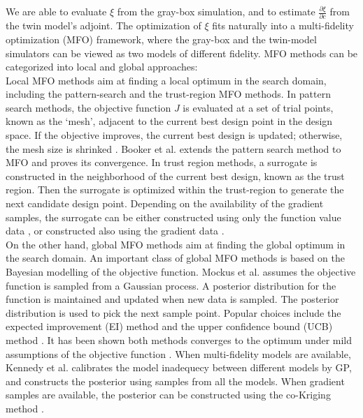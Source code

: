 \documentclass[a4paper,onecolumn]{article}
\theoremstyle{remark}
\begin{document}
\indent We are able to evaluate $\xi$ from the gray-box simulation, and to estimate
$\frac{\partial \xi}{\partial c}$ from the twin model's adjoint. The optimization
of $\xi$ fits naturally into a multi-fidelity optimization (MFO) framework,
where the gray-box and the twin-model simulators can be viewed as two models of different fidelity.
MFO methods can be categorized into local and global approaches:\\

Local MFO methods aim at finding a local optimum in the search domain, including the pattern-search 
and the trust-region MFO methods.
In pattern search methods, the objective function $J$ is evaluated at a set of
trial points, known as the `mesh', adjacent to the current best design point in the design space.
If the objective improves, the current best design is updated; otherwise, the mesh size
is shrinked \cite{Pattern Search Convergence}. 
Booker et al. \cite{Pattern Search Convergence MFO} extends the pattern search method to MFO and
proves its convergence.
In trust region methods, a surrogate is constructed in the neighborhood
of the current best design, known as the trust region.
Then the surrogate is optimized within the trust-region to generate the next
candidate design point. 
Depending on the availability of the gradient samples,
the surrogate can be either constructed using only the function value data \cite{jones1998, trustregionconn, trustregionwild},
or constructed also using the gradient data \cite{Alexandrov trust region, inexactgradient1}.\\

On the other hand, global MFO methods aim at finding the global optimum in the search domain.
An important class of global MFO methods is based on the Bayesian modelling of 
the objective function. 
Mockus et al. \cite{Mockus Bayesian opt} 
assumes the objective function is sampled from a Gaussian process. 
A posterior distribution for the function is maintained and updated when new data is sampled.
The posterior distribution is used to pick the next sample point. Popular choices include
the expected improvement (EI) method \cite{Mockus Bayesian opt, jones1998} and the upper confidence bound
(UCB) method \cite{GP bandit}. It has been shown both methods converges to the optimum 
under mild assumptions of the objective function \cite{convergen EI, converge Bull, GP bandit}.
When multi-fidelity models are available, Kennedy et al. \cite{KennedyOhagan1} 
calibrates the model inadequecy between different models by GP, and constructs
the posterior using samples from all the models. 
When gradient samples are available, the posterior can be constructed using the co-Kriging
method \cite{coKriging1, coKriging2}.\\
\end{document}
